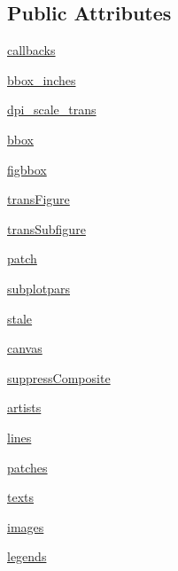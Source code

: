\subsection*{Public Attributes}
\begin{DoxyCompactItemize}
\item 
\hyperlink{classmatplotlib_1_1figure_1_1Figure_a927e936db2f397c938c2997d3a351fac}{callbacks}
\item 
\hyperlink{classmatplotlib_1_1figure_1_1Figure_ab562270c91b2301f949206e691d56255}{bbox\+\_\+inches}
\item 
\hyperlink{classmatplotlib_1_1figure_1_1Figure_a3b59f7e5ffb7ae25d050e9ef111ceca2}{dpi\+\_\+scale\+\_\+trans}
\item 
\hyperlink{classmatplotlib_1_1figure_1_1Figure_a4a65c21137572f6ecd563e123088fede}{bbox}
\item 
\hyperlink{classmatplotlib_1_1figure_1_1Figure_acc26e0638128b2173cf74002b4665e06}{figbbox}
\item 
\hyperlink{classmatplotlib_1_1figure_1_1Figure_a64ee71535d4adde5d13ba01d89856722}{trans\+Figure}
\item 
\hyperlink{classmatplotlib_1_1figure_1_1Figure_a73ebbe1922b00927d745d099f599d636}{trans\+Subfigure}
\item 
\hyperlink{classmatplotlib_1_1figure_1_1Figure_a6dc503d85010fc82fd427928fdb9b689}{patch}
\item 
\hyperlink{classmatplotlib_1_1figure_1_1Figure_a7554e84ab288d9b470fe78f7f8a0d92b}{subplotpars}
\item 
\hyperlink{classmatplotlib_1_1figure_1_1Figure_ab0f01432937499e5754065e1cc70cc81}{stale}
\item 
\hyperlink{classmatplotlib_1_1figure_1_1Figure_abd36f8a6998214bd3c5a359b3fed0996}{canvas}
\item 
\hyperlink{classmatplotlib_1_1figure_1_1Figure_a2a836306777f34e07db8019b0310382f}{suppress\+Composite}
\item 
\hyperlink{classmatplotlib_1_1figure_1_1Figure_a5871b1c94eebc19ba5c02dfdae9f8b86}{artists}
\item 
\hyperlink{classmatplotlib_1_1figure_1_1Figure_a6f3bcd46062562a9d2b3820d4086f245}{lines}
\item 
\hyperlink{classmatplotlib_1_1figure_1_1Figure_acd126aa183834e0e0063bc3b5d812bb5}{patches}
\item 
\hyperlink{classmatplotlib_1_1figure_1_1Figure_a8d5b17e2b2eefc334dda26219493714e}{texts}
\item 
\hyperlink{classmatplotlib_1_1figure_1_1Figure_ae0d5c937d314040277ecf0388de11506}{images}
\item 
\hyperlink{classmatplotlib_1_1figure_1_1Figure_a36fb13c6b8f78f67c124879c259aeccc}{legends}
\end{DoxyCompactItemize}
